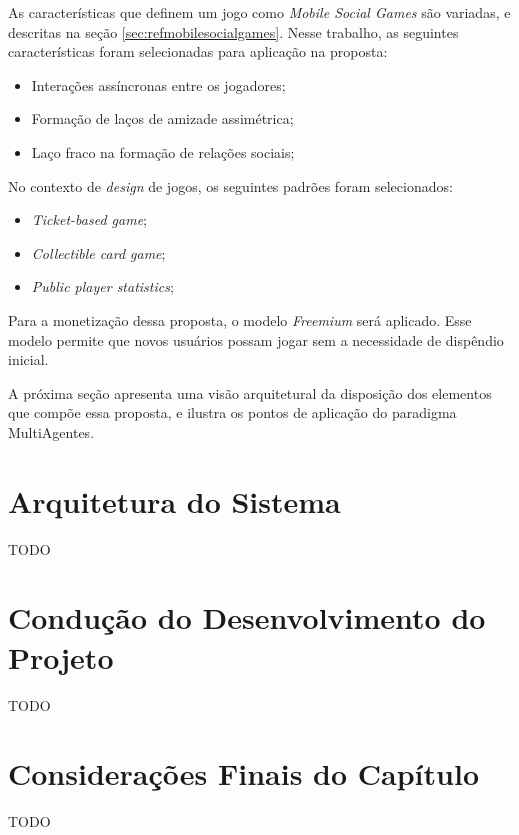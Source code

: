 As características que definem um jogo como \textit{Mobile Social Games}
são variadas, e descritas na seção \ref{sec:refmobilesocialgames}. Nesse
trabalho, as seguintes características foram selecionadas para aplicação na
proposta:

\begin{itemize}
  \item Interações assíncronas entre os jogadores;
  \item Formação de laços de amizade assimétrica;
  \item Laço fraco na formação de relações sociais;
\end{itemize}

No contexto de \textit{design} de jogos, os seguintes padrões foram
selecionados:

\begin{itemize}
  \item \textit{Ticket-based game};
  \item \textit{Collectible card game};
  \item \textit{Public player statistics};
\end{itemize}

Para a monetização dessa proposta, o modelo \textit{Freemium} será aplicado.
Esse modelo permite que novos usuários possam jogar sem a necessidade de
dispêndio inicial.

A próxima seção apresenta uma visão arquitetural da disposição dos elementos
que compõe essa proposta, e ilustra os pontos de aplicação do paradigma
MultiAgentes.

\section{Arquitetura do Sistema}
TODO

\section{Condução do Desenvolvimento do Projeto}
TODO

\section{Considerações Finais do Capítulo}

TODO
